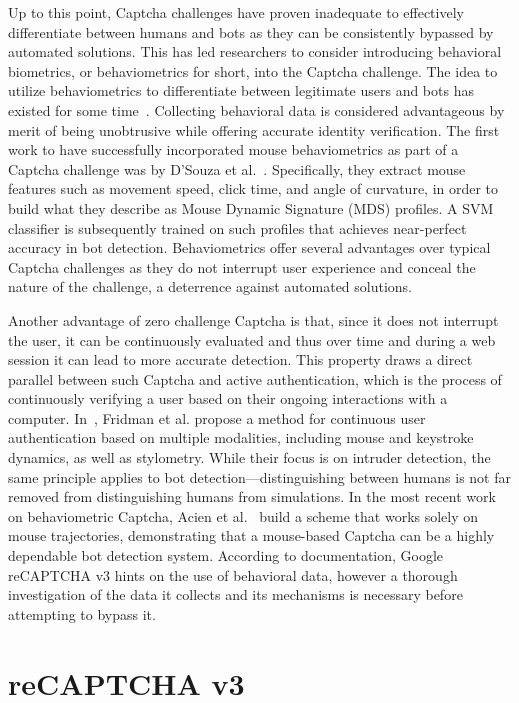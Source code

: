 Up to this point, Captcha challenges have proven inadequate to effectively differentiate between humans and bots as they can be consistently bypassed by automated solutions.
This has led researchers to consider introducing behavioral biometrics, or behaviometrics for short, into the Captcha challenge.
The idea to utilize behaviometrics to differentiate between legitimate users and bots has existed for some time~\cite{yampolskiy2006use, chu2013blog}.
Collecting behavioral data is considered advantageous by merit of being unobtrusive while offering accurate identity verification.
The first work to have successfully incorporated mouse behaviometrics as part of a Captcha challenge was by D'Souza et al.~\cite{d2014avatar}.
Specifically, they extract mouse features such as movement speed, click time, and angle of curvature, in order to build what they describe as Mouse Dynamic Signature (MDS) profiles.
A \gls{SVM} classifier is subsequently trained on such profiles that achieves near-perfect accuracy in bot detection.
Behaviometrics offer several advantages over typical Captcha challenges as they do not interrupt user experience and conceal the nature of the challenge, a deterrence against automated solutions.

Another advantage of zero challenge Captcha is that, since it does not interrupt the user, it can be continuously evaluated and thus over time and during a web session it can lead to more accurate detection.
This property draws a direct parallel between such Captcha and active authentication, which is the process of continuously verifying a user based on their ongoing interactions with a computer.
In~\cite{fridman2015multi}, Fridman et al. propose a method for continuous user authentication based on multiple modalities, including mouse and keystroke dynamics, as well as stylometry.
While their focus is on intruder detection, the same principle applies to bot detection—distinguishing between humans is not far removed from distinguishing humans from simulations.
In the most recent work on behaviometric Captcha, Acien et al.~\cite{acien2020becaptcha} build a scheme that works solely on mouse trajectories, demonstrating that a mouse-based Captcha can be a highly dependable bot detection system.
According to documentation, Google reCAPTCHA v3 hints on the use of behavioral data, however a thorough investigation of the data it collects and its mechanisms is necessary before attempting to bypass it.

\section{reCAPTCHA v3}
\label{sec:recap}

